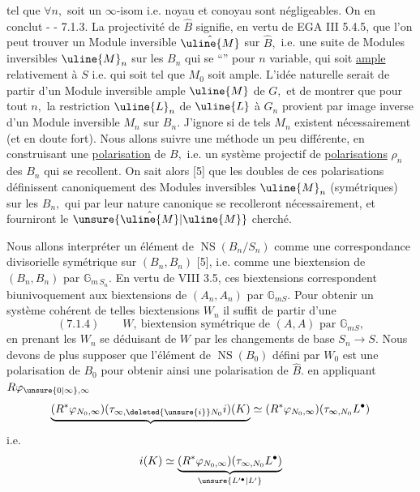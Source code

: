 tel que \(\forall n,\)
soit un \(\infty\)-isom i.e. noyau et conoyau sont négligeables. On en conclut
-  -
7.1.3. La projectivité de \(\hat B\) signifie, en vertu de EGA III 5.4.5, que l'on peut trouver un Module inversible \(\hat{\uline{M}}\) sur \(\hat B,\) i.e. une suite de Modules inversibles \(\uline{M}_n\) sur les \(B_n\) qui se ``'' pour \(n\) variable, qui soit \uline{ample} relativement à \(S\) i.e. qui soit tel que \(M_0\) soit ample. L'idée naturelle serait de partir d'un Module inversible ample \(\uline{M}\) de \(G,\) et de montrer que pour tout \(n,\) la restriction \(\uline{L}_n\) de \(\uline{L}\) à \(G_n\) provient par image inverse d'un Module inversible \(M_n\) sur \(B_n.\) J'ignore si de tels \(M_n\) existent nécessairement (et en doute fort). Nous allons suivre une méthode un peu différente, en construisant une \uline{polarisation} de \(B,\) i.e. un système projectif de \uline{polarisations} \(\rho_n\) des \(B_n\) qui se recollent. On sait alors [5] que les doubles de ces polarisations définissent canoniquement des Modules inversibles \(\uline{M}_n\) (symétriques) sur les \(B_n,\) qui par leur nature canonique se recolleront nécessairement, et fourniront le \(\unsure{\hat{\uline{M}}|\uline{M}}\) cherché.

Nous allons interpréter un élément de \(\operatorname{NS}(B_n/S_n)\) comme une correspondance divisorielle symétrique sur \((B_n,B_n)\) [5], i.e. comme une biextension de \((B_n,B_n)\) par \(\mathbb G_{m\,S_n}.\) En vertu de VIII 3.5, ces biextensions correspondent biunivoquement aux biextensions de \((A_n,A_n)\) par \(\mathbb G_{mS}.\) Pour obtenir un système cohérent de telles biextensions \(W_n\) il suffit de partir d'une
\[
(7.1.4)\qquad W,\ \text{biextension symétrique de }(A,A)\text{ par }\mathbb G_{mS},
\]
en prenant les \(W_n\) se déduisant de \(W\) par les changements de base \(S_n\longrightarrow S.\) Nous devons de plus supposer que l'élément de \(\operatorname{NS}(B_0)\) défini par \(W_0\) est une polarisation de \(B_0\) pour obtenir ainsi une polarisation de \(\hat B.\)
en appliquant \(R\varphi_{\unsure{0|\infty},\infty}\)
\[
\underbrace{(R^*\varphi_{N_0,\infty})(\tau_{\infty,\deleted{\unsure{i}}N_0}i)(K)}
\simeq(R^*\varphi_{N_0,\infty})(\tau_{\infty,N_0}L^\bullet)
\]
i.e.
\[
i(K)\simeq\underbrace{(R^*\varphi_{N_0,\infty})(\tau_{\infty,N_0}L^\bullet)}_{\unsure{L'^\bullet|L'}}
\]

